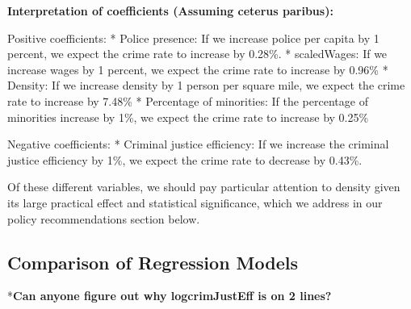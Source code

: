 \documentclass[]{article}
\begin{document}
\textbf{Interpretation of coefficients (Assuming ceterus paribus):}

Positive coefficients: * Police presence: If we increase police per
capita by 1 percent, we expect the crime rate to increase by 0.28\%. *
scaledWages: If we increase wages by 1 percent, we expect the crime rate
to increase by 0.96\% * Density: If we increase density by 1 person per
square mile, we expect the crime rate to increase by 7.48\% * Percentage
of minorities: If the percentage of minorities increase by 1\%, we
expect the crime rate to increase by 0.25\%

Negative coefficients: * Criminal justice efficiency: If we increase the
criminal justice efficiency by 1\%, we expect the crime rate to decrease
by 0.43\%.

Of these different variables, we should pay particular attention to
density given its large practical effect and statistical significance,
which we address in our policy recommendations section below.

\hypertarget{comparison-of-regression-models}{%
\subsection{Comparison of Regression
Models}\label{comparison-of-regression-models}}

*\textbf{Can anyone figure out why logcrimJustEff is on 2 lines?}
\end{document}
